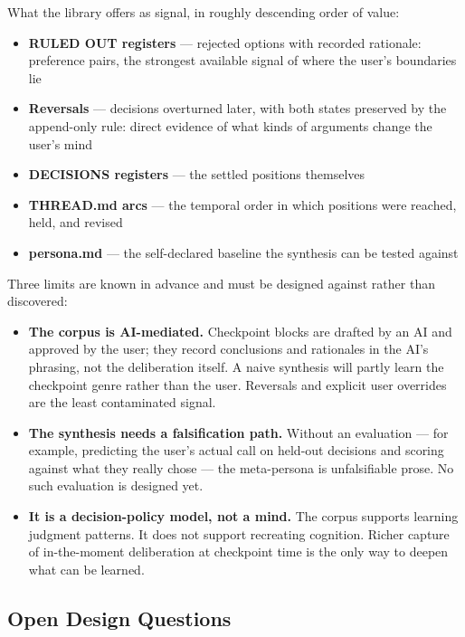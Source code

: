 \documentclass[12pt,letterpaper]{article}
\begin{document}
What the library offers as signal, in roughly descending order of
value:

\begin{itemize}
  \item \textbf{RULED OUT registers} --- rejected options with recorded
        rationale: preference pairs, the strongest available signal of
        where the user's boundaries lie
  \item \textbf{Reversals} --- decisions overturned later, with both
        states preserved by the append-only rule: direct evidence of
        what kinds of arguments change the user's mind
  \item \textbf{DECISIONS registers} --- the settled positions themselves
  \item \textbf{THREAD.md arcs} --- the temporal order in which positions
        were reached, held, and revised
  \item \textbf{persona.md} --- the self-declared baseline the synthesis
        can be tested against
\end{itemize}

Three limits are known in advance and must be designed against rather
than discovered:

\begin{itemize}
  \item \textbf{The corpus is AI-mediated.} Checkpoint blocks are
        drafted by an AI and approved by the user; they record
        conclusions and rationales in the AI's phrasing, not the
        deliberation itself. A naive synthesis will partly learn the
        checkpoint genre rather than the user. Reversals and explicit
        user overrides are the least contaminated signal.
  \item \textbf{The synthesis needs a falsification path.} Without an
        evaluation --- for example, predicting the user's actual call
        on held-out decisions and scoring against what they really
        chose --- the meta-persona is unfalsifiable prose. No such
        evaluation is designed yet.
  \item \textbf{It is a decision-policy model, not a mind.} The corpus
        supports learning judgment patterns. It does not support
        recreating cognition. Richer capture of in-the-moment
        deliberation at checkpoint time is the only way to deepen what
        can be learned.
\end{itemize}

\subsection{Open Design Questions}
\end{document}
